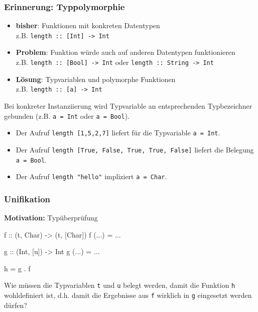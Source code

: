 \documentclass{beamer}
\begin{document}
\begin{frame}[fragile, t] \frametitle{Erinnerung: Typpolymorphie}
	\footnotesize
	\begin{itemize}
		\item \textbf{bisher}: Funktionen mit konkreten Datentypen \\
		z.B. \texttt{length :: [Int] -> Int}
		\item \textbf{Problem}: Funktion würde auch auf anderen Datentypen funktionieren \\
		z.B. \texttt{length :: [Bool] -> Int} oder \texttt{length :: String -> Int}
		\item \textbf{Lösung}: Typvariablen und polymorphe Funktionen \\
		z.B. \texttt{length :: [\alert{a}] -> Int}
	\end{itemize}
	
	\pause
	
	Bei konkreter Instanziierung wird Typvariable an entsprechenden Typbezeichner gebunden (z.B. \texttt{\alert{a} = Int} oder \texttt{\alert{a} = Bool}).
	
	\begin{itemize}
		\item Der Aufruf \texttt{length [1,5,2,7]} liefert für die Typvariable \texttt{\alert{a} = Int}.
		\item Der Aufruf \texttt{length [True, False, True, True, False]} liefert die Belegung \texttt{\alert{a} = Bool}.
		\item Der Aufruf \texttt{length "hello"} impliziert \texttt{\alert{a} = Char}.
	\end{itemize}
\end{frame}


\begin{frame}[fragile] \frametitle{Unifikation}
	\footnotesize
	\textbf{Motivation:} Typüberprüfung
		 
	\begin{codebox}
f :: (t, Char) -> (t, [Char])
f (...) = ... 

g :: (Int, [u]) -> Int
g (...) = ...

h = g . f
	\end{codebox}
	
	\pause
	
	Wie müssen die Typvariablen \texttt{t} und \texttt{u} belegt werden, damit die Funktion \texttt{h} wohldefiniert ist, d.h. damit die Ergebnisse aus \texttt{f} wirklich in \texttt{g} eingesetzt werden dürfen?
\end{frame}
\end{document}
